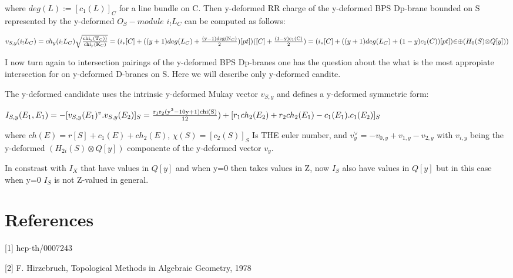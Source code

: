 \documentclass[a4paper,a4paper]{article}
\begin{document}
where $deg(L):=[c_{1}(L)]_C$ for a line bundle on C.  Then y-deformed RR charge of the y-deformed BPS Dp-brane bounded on S represented by the y-deformed $O_{S}-module$   $i_{!}L_{C}$ can be computed  as follows:

\begin{center}
\setlength{\baselineskip}{40pt}
{  $ v_{S,y}(i_{!}L_{C})= ch_{y}(i_{!}L_{C})\sqrt{\frac{\rm chi_{y}(T_C))}{\rm chi_{y}(K_C)}
}=(i_{*}[C]+((y+1)deg(L_{C})+\frac{\rm (y-1)deg(N_{C})}{\rm 2})[pt])([C]+\frac{\rm (1-y)c_1(C)}{\rm 2})=(i_{*}[C]+((y+1)deg(L_{C})+(1-y)c_1(C))[pt]){\in}{\oplus}(H_{0}(S){\otimes}Q[y])) $ }
\end{center}

I now turn again to intersection pairings of the y-deformed BPS Dp-branes one has the question about the what is the most appropiate intersection   for on y-deformed D-branes on S. Here we will describe only y-deformed candite. 

The  y-deformed candidate uses the intrinsic y-deformed Mukay vector  $v_{S,y} $ and defines a y-deformed symmetric form:

\begin{center}
{  $ I_{S,y}(E_{1},E_{1})= -[v_{S,y}(E_{1})^{v}.v_{S,y}(E_{2})]_S=\frac{\rm r_{1}r_{2}(y^2-10y+1)chi(S)}{\rm 12})+[r_{1}ch_{2}(E_{2})+r_{2}ch_{2}(E_{1})-c_{1}(E_{1}).c_{1}(E_{2})]_{S}$ }
\end{center}

where  $ch(E)=r[S]+c_{1}(E)+ch_{2}(E) $,  ${\chi}(S)=[c_{2}(S)]_S $ Is THE euler number, and  $v_{y}^{\vee}=-v_{0,y}+v_{1,y}-v_{2,y} $ with $v_{i,y}$
being the y-deformed $(H_{2i}(S){\otimes}Q[y]) $ componente of the y-deformed vector $v_{y}$.

In constrast with $I_{X}$ that have values in  $Q[y] $ and when y=0 then takes values in Z, now $I_{S} $ also have values in  $Q[y] $ but in this case when y=0 $I_{S} $ is not Z-valued in general.
























 





 


\section{References}

\setlength{\baselineskip}{20pt}
[1]   hep-th/0007243

[2]   F. Hirzebruch, Topological Methods in Algebraic Geometry, 1978







\setlength{\baselineskip}{50pt}   
\end{document}
